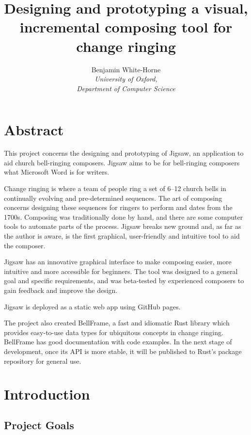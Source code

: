 \documentclass[12pt]{article}
\title{Designing and prototyping a visual, incremental composing tool for change ringing}
\author{Benjamin White-Horne \\ \emph{University of Oxford,} \\ \emph{Department of Computer Science}}
\begin{document}
\maketitle



\pagebreak

\section*{Abstract}

This project concerns the designing and prototyping of Jigsaw, an application to aid church
bell-ringing composers.  Jigsaw aims to be for bell-ringing composers what Microsoft Word is for
writers.

Change ringing is where a team of people ring a set of 6--12 church bells in continually evolving and
pre-determined sequences. The art of composing concerns designing these sequences for ringers to
perform and dates from the 1700s.  Composing was traditionally done by hand, and there are some
computer tools to automate parts of the process. Jigsaw breaks new ground and, as far as the author
is aware, is the first graphical, user-friendly and intuitive tool to aid the composer.

Jigsaw has an innovative graphical interface to make composing easier, more intuitive and more
accessible for beginners. The tool was designed to a general goal and specific requirements, and was
beta-tested by experienced composers to gain feedback and improve the design.

Jigsaw is deployed as a static web app using GitHub pages.

The project also created BellFrame, a fast and idiomatic Rust library which provides easy-to-use
data types for ubiquitous concepts in change ringing. BellFrame has good documentation with code
examples. In the next stage of development, once its API is more stable, it will be published to
Rust's package repository for general use.



\pagebreak

\tableofcontents



\pagebreak

\section{Introduction}

\subsection{Project Goals}\label{sec:design-goals}
\end{document}
